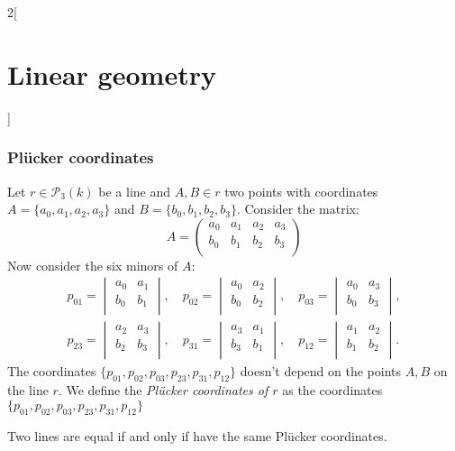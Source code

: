 \documentclass[class=article,10pt,crop=false]{standalone}
\begin{document}
\begin{multicols}{2}[\section{Linear geometry}]
\subsubsection*{Plücker coordinates}
\begin{prop}
Let $r\in\mathcal{P}_3(k)$ be a line and $A,B\in r$ two points with coordinates $A=\{a_0,a_1,a_2,a_3\}$ and $B=\{b_0,b_1,b_2,b_3\}$. Consider the matrix: $$A=\begin{pmatrix}
a_0 & a_1 & a_2 & a_3 \\
b_0 & b_1 & b_2 & b_3 \\
\end{pmatrix}$$ Now consider the six minors of $A$:
\begin{gather*}
    p_{01}=\begin{vmatrix}
a_0 & a_1 \\
b_0 & b_1 \\
\end{vmatrix},\quad p_{02}=\begin{vmatrix}
a_0 & a_2 \\
b_0 & b_2 \\
\end{vmatrix},\quad p_{03}=\begin{vmatrix}
a_0 & a_3 \\
b_0 & b_3 \\
\end{vmatrix},\\ p_{23}=\begin{vmatrix}
a_2 & a_3 \\
b_2 & b_3 \\
\end{vmatrix},\quad p_{31}=\begin{vmatrix}
a_3 & a_1 \\
b_3 & b_1 \\
\end{vmatrix},\quad p_{12}=\begin{vmatrix}
a_1 & a_2 \\
b_1 & b_2 \\
\end{vmatrix}.
\end{gather*}
The coordinates $\{p_{01},p_{02},p_{03},p_{23},p_{31},p_{12}\}$ doesn't depend on the points $A,B$ on the line $r$. We define the \textit{Plücker coordinates of $r$} as the coordinates $\{p_{01},p_{02},p_{03},p_{23},p_{31},p_{12}\}$ 
\end{prop}
\begin{prop}
Two lines are equal if and only if have the same Plücker coordinates.

\end{prop}
\end{multicols}
\end{document}
